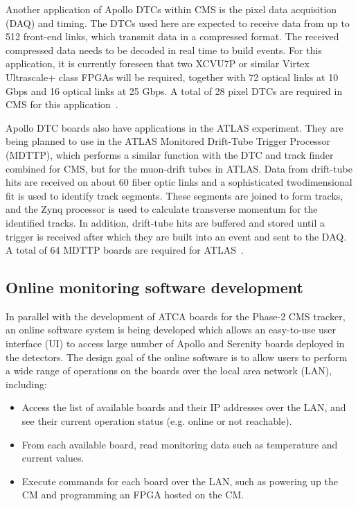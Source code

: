Another application of Apollo DTCs within CMS is the pixel data acquisition (DAQ) and timing.
The DTCs used here are expected to receive data from up to 512 front-end links, which transmit
data in a compressed format. The received compressed data needs to be decoded in real time
to build events. For this application, it is currently foreseen that  two XCVU7P or similar Virtex 
Ultrascale+ class FPGAs will be required, together with 72 optical links at 10 Gbps and 16 optical 
links at 25 Gbps. A total of 28 pixel DTCs are required in CMS for this application~\cite{CMS:ApolloPaper}.

Apollo DTC boards also have applications in the ATLAS experiment. They are being planned to use
in the ATLAS  Monitored Drift-Tube Trigger Processor (MDTTP), which performs a similar function
with the DTC and track finder combined for CMS, but for the muon-drift tubes in ATLAS. Data from drift-tube
hits are received on about 60 fiber optic links and a sophisticated twodimensional fit is used to identify track segments. 
These segments are joined to form tracks, and
the Zynq processor is used to calculate transverse momentum for the identified tracks. In addition,
drift-tube hits are buffered and stored until a trigger is received after which they are built into an
event and sent to the DAQ. A total of 64 MDTTP boards are required for ATLAS~\cite{CMS:ApolloPaper}.

\subsection{Online monitoring software development}

In parallel with the development of ATCA boards for the Phase-2 CMS tracker, an online software system is being
developed which allows an easy-to-use user interface (UI) to access large number of Apollo and Serenity boards
deployed in the detectors. The design goal of the online software is to allow users to perform a wide range of 
operations on the boards over the local area network (LAN), including:

\begin{itemize}
    \item Access the list of available boards and their IP addresses over the LAN, and see their current operation status
    (e.g. online or not reachable).
    \item From each available board, read monitoring data such as temperature and current values.
    \item Execute commands for each board over the LAN, such as powering up the CM and programming an FPGA hosted on the CM.
\end{itemize}

